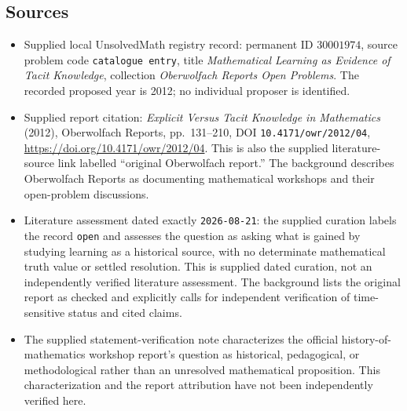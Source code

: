 \documentclass[11pt]{article}
\begin{document}
\subsection{Sources}
\begin{itemize}
\item Supplied local UnsolvedMath registry record: permanent ID \(30001974\), source problem code \texttt{catalogue entry}, title \emph{Mathematical Learning as Evidence of Tacit Knowledge}, collection \emph{Oberwolfach Reports Open Problems}. The recorded proposed year is 2012; no individual proposer is identified.
\item Supplied report citation: \emph{Explicit Versus Tacit Knowledge in Mathematics} (2012), Oberwolfach Reports, pp.~131--210, DOI \texttt{10.4171/owr/2012/04}, \url{https://doi.org/10.4171/owr/2012/04}. This is also the supplied literature-source link labelled ``original Oberwolfach report.'' The background describes Oberwolfach Reports as documenting mathematical workshops and their open-problem discussions.
\item Literature assessment dated exactly \texttt{2026-08-21}: the supplied curation labels the record \texttt{open} and assesses the question as asking what is gained by studying learning as a historical source, with no determinate mathematical truth value or settled resolution. This is supplied dated curation, not an independently verified literature assessment. The background lists the original report as checked and explicitly calls for independent verification of time-sensitive status and cited claims.
\item The supplied statement-verification note characterizes the official history-of-mathematics workshop report's question as historical, pedagogical, or methodological rather than an unresolved mathematical proposition. This characterization and the report attribution have not been independently verified here.
\end{itemize}
\end{document}
